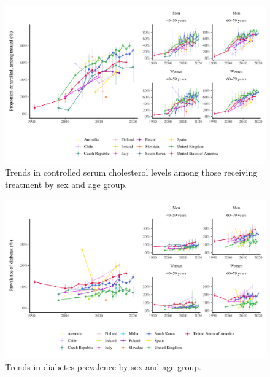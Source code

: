 \documentclass[12pt]{article}
\begin{document}
\begin{appendix}
\begin{refsection}
\begin{landscape}
        \begin{figure}[H]
            \centering
            \includegraphics[width=\linewidth]{../3_figures/controlled_treated.pdf}
            \caption{Trends in controlled serum cholesterol levels among those receiving treatment by sex and age group.}
            \label{fig:controlled_treated}
        \end{figure}


        \begin{figure}[H]
            \centering
            \includegraphics[width=\linewidth]{../3_figures/diab.pdf}
            \caption{Trends in diabetes prevalence by sex and age group.}
            \label{fig:diab}
        \end{figure}
        

\end{landscape}
\end{refsection}
\end{appendix}
\end{document}
